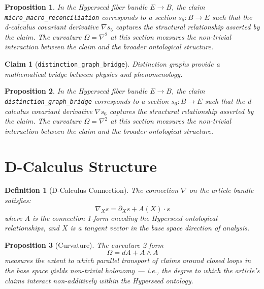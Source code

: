 \documentclass{article}
\newtheorem{claim}{Claim}
\newtheorem{definition}{Definition}
\newtheorem{proposition}{Proposition}
\begin{document}
\begin{proposition}
In the Hyperseed fiber bundle $E \to B$, the claim \texttt{micro_macro_reconciliation} corresponds to a section $s_5: B \to E$ such that the d-calculus covariant derivative $\nabla s_5$ captures the structural relationship asserted by the claim. The curvature $\Omega = \nabla^2$ at this section measures the non-trivial interaction between the claim and the broader ontological structure.
\end{proposition}

\begin{claim}[\texttt{distinction_graph_bridge}]
Distinction graphs provide a mathematical bridge between physics and phenomenology.
\end{claim}

\begin{proposition}
In the Hyperseed fiber bundle $E \to B$, the claim \texttt{distinction_graph_bridge} corresponds to a section $s_6: B \to E$ such that the d-calculus covariant derivative $\nabla s_6$ captures the structural relationship asserted by the claim. The curvature $\Omega = \nabla^2$ at this section measures the non-trivial interaction between the claim and the broader ontological structure.
\end{proposition}

\section{D-Calculus Structure}

\begin{definition}[D-Calculus Connection]
The connection $\nabla$ on the article bundle satisfies:
\begin{equation}
  \nabla_X s = \partial_X s + A(X) \cdot s
\end{equation}
where $A$ is the connection 1-form encoding the Hyperseed ontological relationships, and $X$ is a tangent vector in the base space direction of analysis.
\end{definition}

\begin{proposition}[Curvature]
The curvature 2-form
\begin{equation}
  \Omega = dA + A \wedge A
\end{equation}
measures the extent to which parallel transport of claims around closed loops in the base space yields non-trivial holonomy --- i.e., the degree to which the article's claims interact non-additively within the Hyperseed ontology.
\end{proposition}
\end{document}

